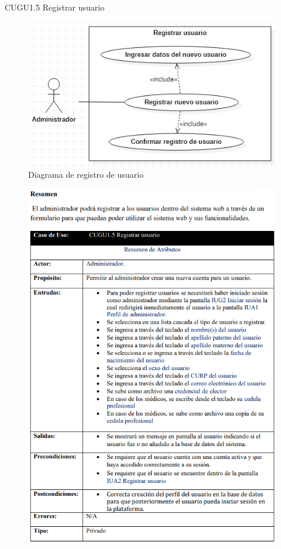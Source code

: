 \documentclass[12pt,letterpaper]{article}
\begin{document}
            \newpage
            CUGU1.5 Registrar usuario 
            \begin{figure}[H]
                \centering
                \includegraphics [scale=0.4]{casosUso/registrarUsuario}
                \caption{Diagrama de registro de usuario}
            \end{figure}
            \begin{figure}[H]
                \centering
                \includegraphics [scale=0.6]{specs/specRegistrarUsuario}
            \end{figure}
\end{document}
